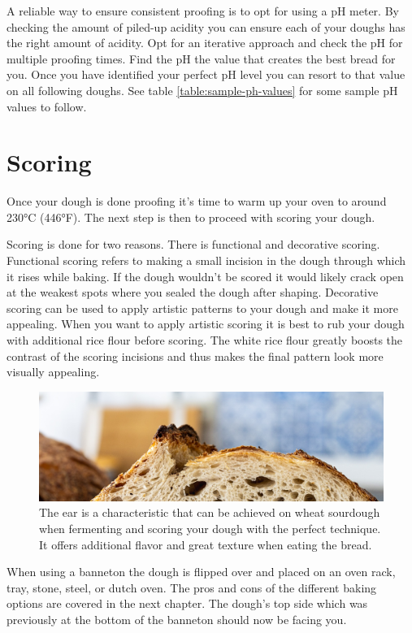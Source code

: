 A reliable way to ensure consistent proofing is to opt for using a pH
meter. By checking the amount of piled-up acidity you can ensure
each of your doughs has the right amount of acidity. Opt for an iterative
approach and check the pH for multiple proofing times. Find the pH
the value that creates the best bread for you. Once you have identified
your perfect pH level you can resort to that value on all following
doughs. See table \ref{table:sample-ph-values} for some sample pH values
to follow.

\section{Scoring}

Once your dough is done proofing it's time to warm up your oven
to around 230°C (446°F). The next step is then to proceed with
scoring your dough.

Scoring is done for two reasons. There is functional and decorative
scoring. Functional scoring refers to making a small incision in the dough
through which it rises while baking. If the dough wouldn't be scored
it would likely crack open at the weakest spots where you sealed
the dough after shaping. Decorative scoring can be used to apply
artistic patterns to your dough and make it more appealing. When
you want to apply artistic scoring it is best to rub your dough
with additional rice flour before scoring. The white rice flour
greatly boosts the contrast of the scoring incisions and thus
makes the final pattern look more visually appealing.

\begin{figure}[htb!]
  \includegraphics[width=\textwidth]{the-ear}
  \caption{The ear is a characteristic that can be achieved on wheat sourdough
  when fermenting and scoring your dough with the perfect technique. It offers additional
  flavor and great texture when eating the bread.}
  \label{fig:the-ear}
\end{figure}

When using a banneton the dough is flipped over and
placed on an oven rack, tray, stone, steel, or dutch oven. The pros
and cons of the different baking options are covered in the next chapter.
The dough's top side which was previously at the bottom of the
banneton should now be facing you.


